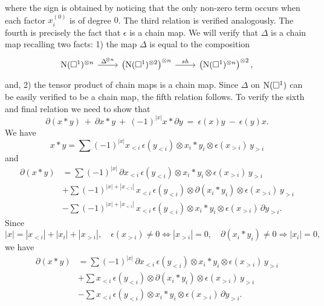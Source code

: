where the sign is obtained by noticing that the only non-zero term occurs when each factor $x_i^{(0)}$ is of degree $0$.
The third relation is verified analogously.
The fourth is precisely the fact that $\epsilon$ is a chain map.
We will verify that $\Delta$ is a chain map recalling two facts: 1) the map $\Delta$ is equal to the composition
\begin{equation*}
\begin{tikzcd}
\chains(\square^1)^{\otimes n} \arrow[r, "\Delta^{\!\otimes n}"] &
\left( \chains(\square^1)^{\otimes 2} \right)^{\otimes n} \arrow[r, "sh"] &
\left( \chains(\square^1)^{\otimes n} \right)^{\otimes 2},
\end{tikzcd}
\end{equation*}
and, 2) the tensor product of chain maps is a chain map.
Since $\Delta$ on $\operatorname{N}(\square^1)$ can be easily verified to be a chain map, the fifth relation follows.
To verify the sixth and final relation we need to show that
\begin{equation*}
\partial (x \ast y)\ +\ \partial x \ast y\ +\ (-1)^{|x|}x \ast \partial y\ =\ \epsilon(x) y \ -\ \epsilon(y) x.
\end{equation*}
We have
\begin{equation*}
x \ast y = \sum (-1)^{|x|} x_{<i} \, \epsilon(y_{<i}) \otimes x_i \ast y_i \otimes \epsilon(x_{>i})\, y_{>i}
\end{equation*}
and
\begin{align*}
\partial(x \ast y) & = 
\sum (-1)^{|x|} \, \partial x_{<i}\, \epsilon(y_{<i}) \otimes x_i \ast y_i \otimes \epsilon(x_{>i})\, y_{>i} \\ & +
\sum (-1)^{|x|+|x_{<i}|} \, x_{<i}\, \epsilon(y_{<i}) \otimes \partial (x_i \ast y_i) \otimes \epsilon(x_{>i}) \, y_{>i} \\ & -
\sum (-1)^{|x|+|x_{<i}|} \, x_{<i}\, \epsilon(y_{<i}) \otimes x_i \ast y_i \otimes \epsilon(x_{>i})\, \partial y_{>i}.
\end{align*}
Since
\begin{equation*}
|x| = |x_{<i}| + |x_i| + |x_{>i}|, \quad \epsilon(x_{>i}) \neq 0 \Leftrightarrow |x_{>i}| = 0, \quad \partial(x_i \ast y_i) \neq 0 \Rightarrow |x_i| = 0,
\end{equation*}
we have
\begin{equation} \label{e:boundary of product 1}
\begin{split}
\partial(x \ast y) & = 
\sum (-1)^{|x|} \, \partial x_{<i}\, \epsilon(y_{<i}) \otimes x_i \ast y_i \otimes \epsilon(x_{>i})\, y_{>i} \\ & +
\sum x_{<i} \, \epsilon(y_{<i}) \otimes \partial (x_i \ast y_i) \otimes \epsilon(x_{>i})\, y_{>i} \\ & -
\sum x_{<i} \, \epsilon(y_{<i}) \otimes x_i \ast y_i \otimes \epsilon(x_{>i})\, \partial y_{>i}.
\end{split}
\end{equation}
